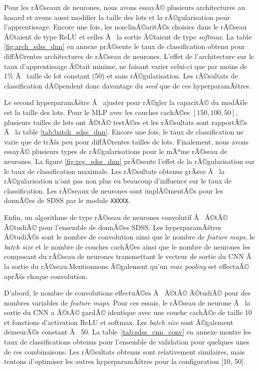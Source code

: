 \documentclass{article}
\begin{document}
Pour les rÃ©seaux de neurones, nous avons essayÃ© plusieurs architectures au hasard et avons aussi modifier la taille des lots et la rÃ©gularisation pour l'apprentissage. Encore une fois, les non-linÃ©aritÃ©s choisies dans le rÃ©seau Ã©taient de type {ReLU} et celles Ã  la sortie Ã©taient de type \textit{softmax}. La table \ref{fig:arch_sdss_dnn} en annexe prÃ©sente le taux de classification obtenu pour diffÃ©rentes architectures de rÃ©seau de neurones. L'effet de l'architecture sur le taux d'apprentissage Ã©tait minime, ne faisant varier celui-ci que par moins de 1\% Ã  taille de lot constant (50) et sans rÃ©gularisation. Les rÃ©sultats de classification dÃ©pendent donc davantage du \textit{seed} que de ces hyperparamÃštres.

Le second hyperparamÃštre Ã  ajuster pour rÃ©gler la capacitÃ© du modÃšle est la taille des lots. Pour le MLP avec les couches cachÃ©es $[150,100,50]$, plusieurs tailles de lots ont Ã©tÃ© testÃ©es et les rÃ©sultats sont rapportÃ©s Ã  la table \ref{tab:batch_sdss_dnn}. Encore une fois, le taux de classification ne varie que de trÃšs peu pour diffÃ©rentes tailles de lots.  Finalement, nous avons essayÃ© plusieurs types de rÃ©gularisations pour le mÃªme rÃ©seau de neurones. La figure \ref{fig:reg_sdss_dnn} prÃ©sente l'effet de la rÃ©gularisation sur le taux de classification maximale. Les rÃ©sultats obtenus grÃ¢ce Ã  la rÃ©gularisation n'ont pas non plus eu beaucoup d'influence sur le taux de classification. Les rÃ©seaux de neurones sont implÃ©mentÃ©s pour les donnÃ©es de SDSS par le module \texttt{XXXXX}.

Enfin, un algorithme de type rÃ©seau de neurones convolutif Ã  Ã©tÃ© Ã©tudiÃ© pour l'ensemble de donnÃ©es SDSS. Les hyperparamÃštres Ã©tudiÃ©s sont le nombre de convolution ainsi que le nombre de \textit{feature maps}, le \textit{batch size} et le nombre de couches cachÃ©es ainsi que le nombre de neurones les composant du rÃ©seau de neurones transmettant le vecteur de sortie du CNN Ã  la sortie du rÃ©seau.Mentionnons Ã©galement qu'un \textit{max pooling} est effectuÃ© aprÃšs chaque convolution.

D'abord, le nombre de convolutions effectuÃ©es Ã  Ã©tÃ© Ã©tudiÃ© pour des nombres variables de \textit{feature maps}. Pour ces essais, le rÃ©seau de neurone Ã  la sortie du CNN a Ã©tÃ© gardÃ© identique avec une couche cachÃ©e de taille 10 et fonctions d'activation ReLU et softmax. Les \textit{batch size} sont Ã©galement demeurÃ©s constant Ã  50. La table~\ref{tab:sdss_cnn_conv} en annexe montre les taux de classifications obtenus pour l'ensemble de validation pour quelques unes de ces combinaisons. Les rÃ©sultats obtenus sont relativement similaires, mais tentons d'optimiser les autres hyperparamÃštres pour la configuration [10, 50].
\end{document}
